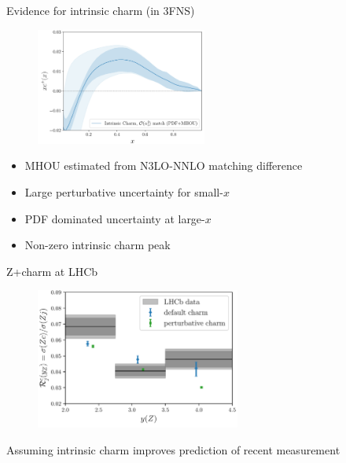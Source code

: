 \documentclass[aspectratio=43, 8pt,t]{beamer}
\begin{document}
\begin{frame}{Evidence for intrinsic charm (in 3FNS)}
  \begin{figure}
    \includegraphics[width=0.5\textwidth]{discovery_of_ic.png}
  \end{figure}
  \begin{itemize}
    \item MHOU estimated from N3LO-NNLO matching difference
    \item Large perturbative uncertainty for small-$x$
    \item PDF dominated uncertainty at large-$x$
    \item Non-zero intrinsic charm peak
  \end{itemize}
\end{frame}

\begin{frame}{Z+charm at LHCb}
  \begin{figure}
    \includegraphics[width=0.6\textwidth]{lhcb_data.png}
  \end{figure}
  Assuming intrinsic charm improves prediction of recent measurement
\end{frame}
\end{document}

